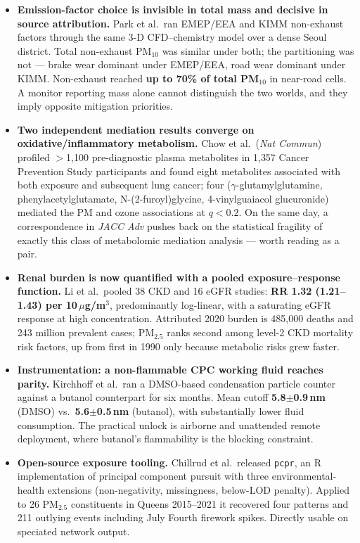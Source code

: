 \documentclass[10pt]{article}
\begin{document}
\footnotesize
\begin{itemize}
\item \textbf{Emission-factor choice is invisible in total mass and decisive in source
attribution.} Park et al.\ ran EMEP/EEA and KIMM non-exhaust factors through the same
3-D CFD--chemistry model over a dense Seoul district. Total non-exhaust PM$_{10}$ was
similar under both; the partitioning was not --- brake wear dominant under EMEP/EEA,
road wear dominant under KIMM. Non-exhaust reached \textbf{up to 70\% of total
PM$_{10}$} in near-road cells. A monitor reporting mass alone cannot distinguish the two
worlds, and they imply opposite mitigation priorities.

\item \textbf{Two independent mediation results converge on oxidative/inflammatory
metabolism.} Chow et al.\ (\textit{Nat Commun}) profiled $>$1{,}100 pre-diagnostic plasma
metabolites in 1{,}357 Cancer Prevention Study participants and found eight metabolites
associated with both exposure and subsequent lung cancer; four
($\gamma$-glutamylglutamine, phenylacetylglutamate, N-(2-furoyl)glycine,
4-vinylguaiacol glucuronide) mediated the PM and ozone associations at $q<0.2$. On the
same day, a correspondence in \textit{JACC Adv} pushes back on the statistical fragility
of exactly this class of metabolomic mediation analysis --- worth reading as a pair.

\item \textbf{Renal burden is now quantified with a pooled exposure--response function.}
Li et al.\ pooled 38 CKD and 16 eGFR studies: \textbf{RR 1.32 (1.21--1.43) per
10\,$\mu$g/m$^3$}, predominantly log-linear, with a saturating eGFR response at high
concentration. Attributed 2020 burden is 485{,}000 deaths and 243 million prevalent
cases; PM$_{2.5}$ ranks second among level-2 CKD mortality risk factors, up from first in
1990 only because metabolic risks grew faster.

\item \textbf{Instrumentation: a non-flammable CPC working fluid reaches parity.}
Kirchhoff et al.\ ran a DMSO-based condensation particle counter against a butanol
counterpart for six months. Mean cutoff \textbf{5.8$\pm$0.9\,nm} (DMSO) vs.\
\textbf{5.6$\pm$0.5\,nm} (butanol), with substantially lower fluid consumption. The
practical unlock is airborne and unattended remote deployment, where butanol's
flammability is the blocking constraint.

\item \textbf{Open-source exposure tooling.} Chillrud et al.\ released \texttt{pcpr},
an R implementation of principal component pursuit with three environmental-health
extensions (non-negativity, missingness, below-LOD penalty). Applied to 26 PM$_{2.5}$
constituents in Queens 2015--2021 it recovered four patterns and 211 outlying events
including July Fourth firework spikes. Directly usable on speciated network output.


\end{itemize}
\end{document}
